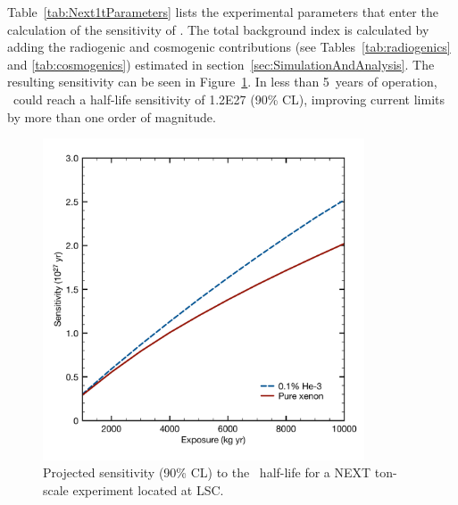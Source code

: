 Table~\ref{tab:Next1tParameters} lists the experimental parameters that enter the calculation of the sensitivity of \NHD. The total background index is calculated by adding the radiogenic and cosmogenic contributions (see Tables~\ref{tab:radiogenics} and \ref{tab:cosmogenics}) estimated in section~\ref{sec:SimulationAndAnalysis}. The resulting sensitivity can be seen in Figure~\ref{fig:Sensitivity}. In less than 5~years of operation, \NHD\ could reach a half-life sensitivity of \SI{1.2E27}{\year} (90\% CL), improving current limits by more than one order of magnitude.

\begin{figure}
\centering
\includegraphics[width=0.85\textwidth]{img/sensitivity_nexthd_lsc.pdf}
\caption{Projected sensitivity (90\% CL) to the  \bbonu\ half-life for a NEXT ton-scale experiment located at LSC. \label{fig:Sensitivity}}
\end{figure}
